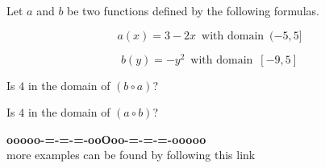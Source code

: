 \documentclass{ximera}
\begin{document}
\begin{question}




Let $a$ and $b$ be two functions defined by the following formulas.

\[
a(x) = 3 - 2x \,  \text{ with domain }  \,  (-5, 5]
\]


\[
b(y) = -y^2 \,  \text{ with domain }  \,  [-9, 5]
\]


Is $4$ in the domain of $(b \circ a)$?

\begin{multipleChoice}
\end{multipleChoice}







Is $4$ in the domain of $(a \circ b)$?

\begin{multipleChoice}
\end{multipleChoice}



\end{question}








\begin{onlineOnly}
\begin{center}
\textbf{\textcolor{green!50!black}{ooooo-=-=-=-ooOoo-=-=-=-ooooo}} \\

more examples can be found by following this link\\ 

\end{center}
\end{onlineOnly}
\end{document}
